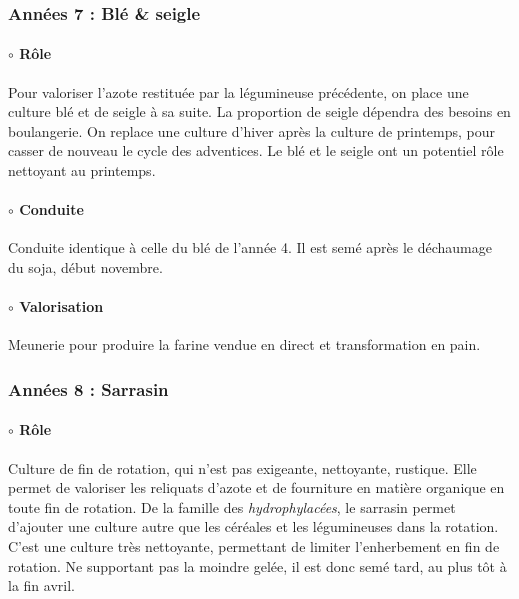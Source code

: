 \documentclass{book}
\begin{document}
\subsubsection{Années 7 : Blé \& seigle}

\paragraph{$\circ$ Rôle} Pour valoriser l'azote restituée par la légumineuse précédente, on place une culture blé et de seigle à sa suite. La proportion de seigle dépendra des besoins en boulangerie. On replace une culture d'hiver après la culture de printemps, pour casser de nouveau le cycle des adventices. Le blé et le seigle ont un potentiel rôle nettoyant au printemps.

\paragraph{$\circ$ Conduite} Conduite identique à celle du blé de l'année 4. Il est semé après le déchaumage du soja, début novembre.

\paragraph{$\circ$ Valorisation} Meunerie pour produire la farine vendue en direct et transformation en pain.

\subsubsection{Années 8 : Sarrasin}

\paragraph{$\circ$ Rôle} Culture de fin de rotation, qui n'est pas exigeante, nettoyante, rustique. Elle permet de valoriser les reliquats d'azote et de fourniture en matière organique en toute fin de rotation. De la famille des \textit{hydrophylacées}, le sarrasin permet d'ajouter une culture autre que les céréales et les légumineuses dans la rotation. C'est une culture très nettoyante, permettant de limiter l'enherbement en fin de rotation. Ne supportant pas la moindre gelée, il est donc semé tard, au plus tôt à la fin avril.
\end{document}
